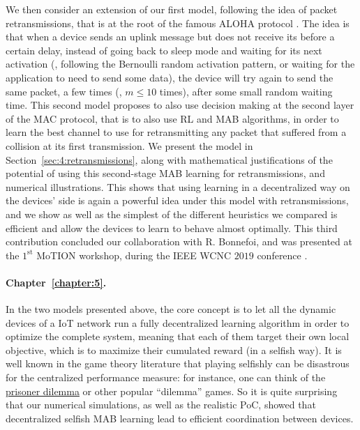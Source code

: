 We then consider an extension of our first model, following the idea of packet retransmissions, that is at the root of the famous ALOHA protocol \cite{Abramson1970,Roberts75}.
The idea is that when a device sends an uplink message but does not receive its \Ack{} before a certain delay, instead of going back to sleep mode and waiting for its next activation (\eg, following the Bernoulli random activation pattern, or waiting for the application to need to send some data), the device will try again to send the same packet, a few times (\eg, $m \leq 10$ times), after some small random waiting time.
%
This second model proposes to also use decision making at the second layer of the MAC protocol, that is to also use RL and MAB algorithms, in order to learn the best channel to use for retransmitting any packet that suffered from a collision at its first transmission.
We present the model in Section~\ref{sec:4:retransmissions}, along with mathematical justifications of the potential of using this second-stage MAB learning for retransmissions, and numerical illustrations.
This shows that using learning in a decentralized way on the devices' side is again a powerful idea under this model with retransmissions, and we show as well as the simplest of the different heuristics we compared is efficient and allow the devices to learn to behave almost optimally.
This third contribution concluded our collaboration with R. Bonnefoi, and was presented at the $1^{\text{st}}$ MoTION workshop, during the IEEE WCNC $2019$ conference \cite{Bonnefoi2019WCNC}.


\paragraph{Chapter~\ref{chapter:5}.}
%
In the two models presented above, the core concept is to let all the dynamic devices of a IoT network run a fully decentralized learning algorithm in order to optimize the complete system,
meaning that each of them target their own local objective, which is to maximize their cumulated reward (in a selfish way).
It is well known in the game theory literature that playing selfishly can be disastrous for the centralized performance measure: for instance, one can think of the \href{https://en.wikipedia.org/wiki/Prisoner%27s_dilemma}{prisoner dilemma} or other popular ``dilemma'' games.
So it is quite surprising that our numerical simulations, as well as the realistic PoC, showed that decentralized selfish MAB learning lead to efficient coordination between devices.

